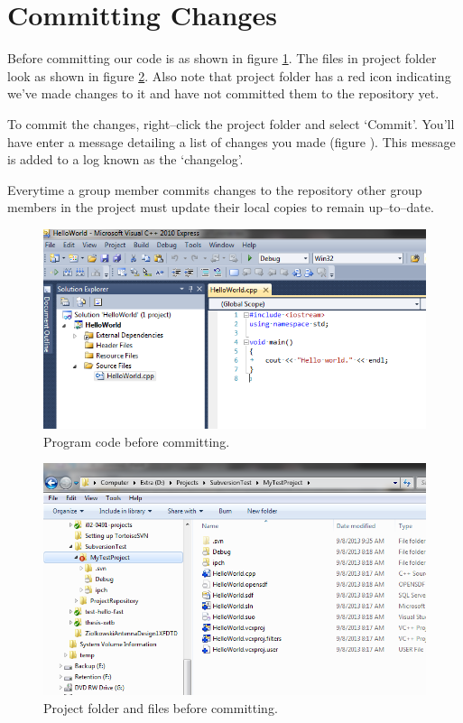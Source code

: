\documentclass[12pt,a4paper]{article}
\begin{document}
\section{Committing Changes}
Before committing our code is as shown in figure \ref{code-before-committing}. The files in project folder look as shown in figure \ref{project-before-committing}. Also note that project folder has a red icon indicating we've made changes to it and have not committed them to the repository yet.

To commit the changes, right--click the project folder and select `Commit'. You'll have enter a message detailing a list of changes you made (figure ). This message is added to a log known as the `changelog'.

Everytime a group member commits changes to the repository other group members in the project must update their local copies to remain up--to--date.
\begin{figure}[H]
\centering
\includegraphics[scale=0.75]{ProgramBeforeCommit.png}
\caption{Program code before committing.}
\label{code-before-committing}
\end{figure}
\begin{figure}[H]
\centering
\includegraphics[scale=0.75]{ProjectBeforeCommit.png}
\caption{Project folder and files before committing.}
\label{project-before-committing}
\end{figure}
\end{document}
